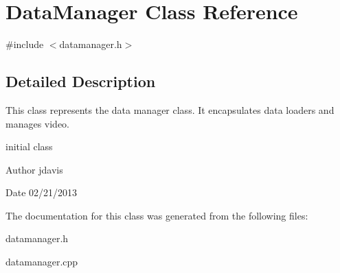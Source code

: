 \hypertarget{classDataManager}{\section{Data\-Manager Class Reference}
\label{classDataManager}
}


{\ttfamily \#include $<$datamanager.\-h$>$}



\subsection{Detailed Description}
This class represents the data manager class. It encapsulates data loaders and manages video.

initial class \begin{DoxyAuthor}{Author}
jdavis 
\end{DoxyAuthor}
\begin{DoxyDate}{Date}
02/21/2013 
\end{DoxyDate}


The documentation for this class was generated from the following files\-:\begin{DoxyCompactItemize}
\item 
datamanager.\-h\item 
datamanager.\-cpp\end{DoxyCompactItemize}

